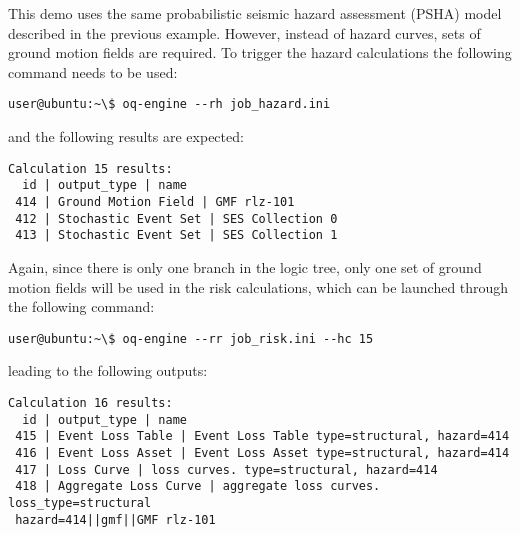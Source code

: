 This demo uses the same probabilistic seismic hazard assessment (PSHA) model described in the previous example. However, instead of hazard curves, sets of ground motion fields are required. To trigger the hazard calculations the following command needs to be used:

\begin{Verbatim}[frame=single, commandchars=\\\{\}, samepage=true]
user@ubuntu:~\$ oq-engine --rh job_hazard.ini
\end{Verbatim}

and the following results are expected:

\begin{Verbatim}[frame=single, commandchars=\\\{\}, samepage=true]
Calculation 15 results:
  id | output_type | name
 414 | Ground Motion Field | GMF rlz-101
 412 | Stochastic Event Set | SES Collection 0
 413 | Stochastic Event Set | SES Collection 1
\end{Verbatim}

Again, since there is only one branch in the logic tree, only one set of ground motion fields will be used in the risk calculations, which can be launched through the following command:

\begin{Verbatim}[frame=single, commandchars=\\\{\}, samepage=true]
user@ubuntu:~\$ oq-engine --rr job_risk.ini --hc 15
\end{Verbatim}

leading to the following outputs:

\begin{Verbatim}[frame=single, commandchars=\\\{\}, samepage=true]
Calculation 16 results:
  id | output_type | name
 415 | Event Loss Table | Event Loss Table type=structural, hazard=414
 416 | Event Loss Asset | Event Loss Asset type=structural, hazard=414
 417 | Loss Curve | loss curves. type=structural, hazard=414
 418 | Aggregate Loss Curve | aggregate loss curves. loss_type=structural 
 hazard=414||gmf||GMF rlz-101
\end{Verbatim}